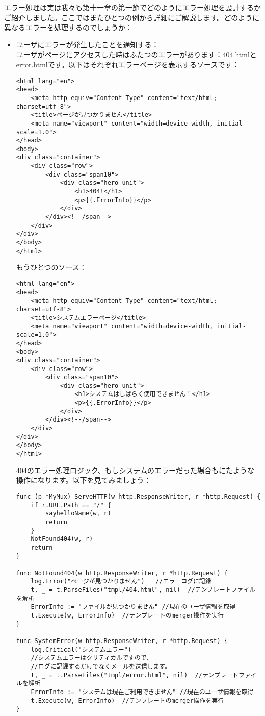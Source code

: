 エラー処理は実は我々も第十一章の第一節でどのようにエラー処理を設計するかご紹介しました。ここではまたひとつの例から詳細にご解説します。どのように異なるエラーを処理するのでしょうか：

\begin{itemize}
  \item ユーザにエラーが発生したことを通知する：\\ ユーザがページにアクセスした時はふたつのエラーがあります：404.htmlとerror.htmlです。以下はそれぞれエラーページを表示するソースです：
\begin{lstlisting}[numbers=none]
<html lang="en">
<head>
    <meta http-equiv="Content-Type" content="text/html; charset=utf-8">
    <title>ページが見つかりません</title>
    <meta name="viewport" content="width=device-width, initial-scale=1.0">
</head>
<body>
<div class="container">
    <div class="row">
        <div class="span10">
            <div class="hero-unit">
                <h1>404!</h1>
                <p>{{.ErrorInfo}}</p>
            </div>
        </div><!--/span-->
    </div>
</div>
</body>
</html>
\end{lstlisting}
もうひとつのソース：
\begin{lstlisting}[numbers=none]
<html lang="en">
<head>
    <meta http-equiv="Content-Type" content="text/html; charset=utf-8">
    <title>システムエラーページ</title>
    <meta name="viewport" content="width=device-width, initial-scale=1.0">
</head>
<body>
<div class="container">
    <div class="row">
        <div class="span10">
            <div class="hero-unit">
                <h1>システムはしばらく使用できません！</h1>
                <p>{{.ErrorInfo}}</p>
            </div>
        </div><!--/span-->
    </div>
</div>
</body>
</html>
\end{lstlisting}
404のエラー処理ロジック、もしシステムのエラーだった場合もにたような操作になります。以下を見てみましょう：
\begin{lstlisting}[numbers=none]
func (p *MyMux) ServeHTTP(w http.ResponseWriter, r *http.Request) {
    if r.URL.Path == "/" {
        sayhelloName(w, r)
        return
    }
    NotFound404(w, r)
    return
}

func NotFound404(w http.ResponseWriter, r *http.Request) {
    log.Error("ページが見つかりません")   //エラーログに記録
    t, _ = t.ParseFiles("tmpl/404.html", nil)  //テンプレートファイルを解析
    ErrorInfo := "ファイルが見つかりません" //現在のユーザ情報を取得
    t.Execute(w, ErrorInfo)  //テンプレートのmerger操作を実行
}

func SystemError(w http.ResponseWriter, r *http.Request) {
    log.Critical("システムエラー")
    //システムエラーはクリティカルですので、
    //ログに記録するだけでなくメールを送信します。
    t, _ = t.ParseFiles("tmpl/error.html", nil)  //テンプレートファイルを解析
    ErrorInfo := "システムは現在ご利用できません" //現在のユーザ情報を取得
    t.Execute(w, ErrorInfo)  //テンプレートのmerger操作を実行
}
\end{lstlisting}
\end{itemize}
